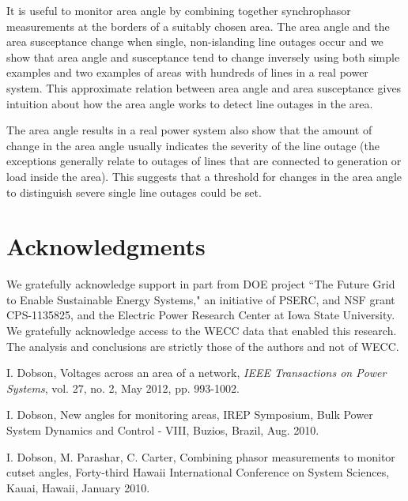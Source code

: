 \documentclass[conference]{IEEEtran}
\begin{document}
{{ It is useful to monitor area angle by combining together synchrophasor measurements at the borders of a suitably chosen area.
The area angle and the area susceptance change when single, non-islanding line outages occur and we show that area angle and susceptance tend to change inversely
using both simple examples and two examples of areas  with hundreds of lines in a real power system.
This approximate relation between area angle and area susceptance gives intuition about how the area angle works
to detect line outages in the area.

The area angle results in a real power system also show that the amount of change in the area angle usually indicates the severity of the line outage
(the exceptions generally relate to outages of lines that are connected to generation or load inside the area).
This suggests that a threshold for changes in the area angle to distinguish severe single line outages could be set.

\newpage
\section*{Acknowledgments}
\label{ack}
We gratefully acknowledge support in part from 
DOE project ``The Future Grid to Enable Sustainable Energy Systems," an initiative of PSERC, 
and
NSF grant CPS-1135825, and the  Electric Power Research Center at Iowa State University.
We gratefully acknowledge access to the WECC data that enabled this research.
The analysis and conclusions are strictly those of the authors and not of WECC.

\newpage




  \begin{thebibliography}{9}
  
  \vspace{2pt}



  I. Dobson,  Voltages across an area of a network, {\sl IEEE Transactions on Power Systems}, vol. 27, no. 2, May 2012, pp. 993-1002. 


   I. Dobson, New angles for monitoring areas, IREP Symposium,
Bulk Power System Dynamics and Control - VIII, Buzios,  Brazil, Aug. 2010.


  I. Dobson, M. Parashar, C. Carter, Combining phasor measurements to monitor cutset angles,  
Forty-third Hawaii International Conference on System Sciences, Kauai, Hawaii, January 2010.


\end{thebibliography}}}
\end{document}

